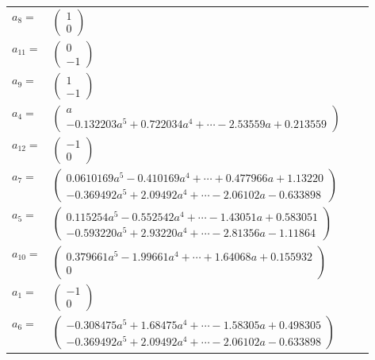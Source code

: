 \documentclass[1p]{elsarticle_modified}
\theoremstyle{definition}
\begin{document}
\begin{tabular}{m{7pt} m{180pt} m{7pt} m{180pt} }
\flushright $a_{8}=$&$\begin{pmatrix}1\\0\end{pmatrix}$ \\
\flushright $a_{11}=$&$\begin{pmatrix}0\\-1\end{pmatrix}$ \\
\flushright $a_{9}=$&$\begin{pmatrix}1\\-1\end{pmatrix}$ \\
\flushright $a_{4}=$&$\begin{pmatrix}a\\-0.132203 a^{5}+0.722034 a^{4}+\cdots-2.53559 a+0.213559\end{pmatrix}$ \\
\flushright $a_{12}=$&$\begin{pmatrix}-1\\0\end{pmatrix}$ \\
\flushright $a_{7}=$&$\begin{pmatrix}0.0610169 a^{5}-0.410169 a^{4}+\cdots+0.477966 a+1.13220\\-0.369492 a^{5}+2.09492 a^{4}+\cdots-2.06102 a-0.633898\end{pmatrix}$ \\
\flushright $a_{5}=$&$\begin{pmatrix}0.115254 a^{5}-0.552542 a^{4}+\cdots-1.43051 a+0.583051\\-0.593220 a^{5}+2.93220 a^{4}+\cdots-2.81356 a-1.11864\end{pmatrix}$ \\
\flushright $a_{10}=$&$\begin{pmatrix}0.379661 a^{5}-1.99661 a^{4}+\cdots+1.64068 a+0.155932\\0\end{pmatrix}$ \\
\flushright $a_{1}=$&$\begin{pmatrix}-1\\0\end{pmatrix}$ \\
\flushright $a_{6}=$&$\begin{pmatrix}-0.308475 a^{5}+1.68475 a^{4}+\cdots-1.58305 a+0.498305\\-0.369492 a^{5}+2.09492 a^{4}+\cdots-2.06102 a-0.633898\end{pmatrix}$ \\

\end{tabular}
\end{document}
